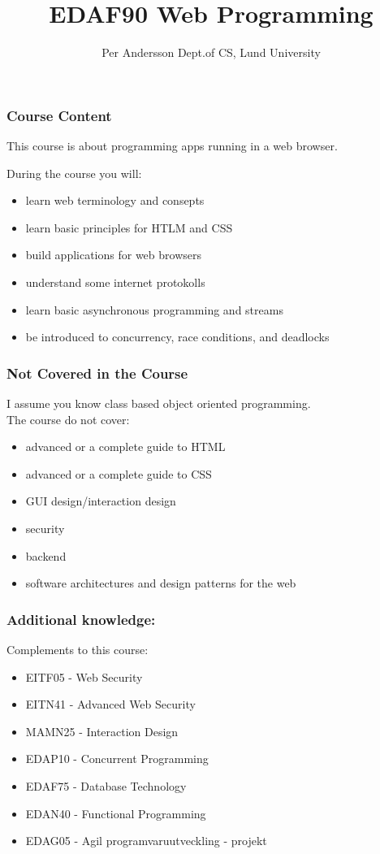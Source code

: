 \documentclass[aspectratio=1610]{beamer}
\title[EDAF90 Web Programming]{EDAF90 Web Programming}
\author[Per Andersson]{%
  Per Andersson\newline
  Dept.\@ of CS, Lund University}
\begin{document}
\begin{frame}[plain]%
  \titlepage
\end{frame}

\begin{frame}
  \frametitle{Course Content}

This course is about programming apps running in a web browser.

\vspace{5mm}

During the course you will:
\begin{itemize}
\item learn web terminology and consepts
\item learn basic principles for HTLM and CSS
\item build applications for web browsers
\item understand some internet protokolls
\item learn basic asynchronous programming and streams
\item be introduced to concurrency, race conditions, and deadlocks
\end{itemize}

\end{frame}


\begin{frame}
  \frametitle{Not Covered in the Course}
I assume you know class based object oriented programming.
\\ \vspace{5mm}
The course do not cover:
\begin{itemize}
\item advanced or a complete guide to HTML
\item advanced or a complete guide to  CSS
\item GUI design/interaction design
\item security
\item backend
\item software architectures and design patterns for the web
\end{itemize}

\end{frame}

\begin{frame}
  \frametitle{Additional knowledge:}
Complements to this course:
\begin{itemize}
\item EITF05 - Web Security
\item EITN41 - Advanced Web Security
\item MAMN25 - Interaction Design
\item EDAP10  - Concurrent Programming
\item EDAF75 - Database Technology
\item EDAN40 - Functional Programming
\item EDAG05 - Agil programvaruutveckling - projekt
\end{itemize}

\end{frame}
\end{document}
